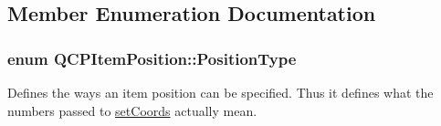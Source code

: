 \subsection{Member Enumeration Documentation}
\subsubsection[{\texorpdfstring{Position\+Type}{PositionType}}]{\setlength{\rightskip}{0pt plus 5cm}enum {\bf Q\+C\+P\+Item\+Position\+::\+Position\+Type}}\hypertarget{classQCPItemPosition_aad9936c22bf43e3d358552f6e86dbdc8}{}\label{classQCPItemPosition_aad9936c22bf43e3d358552f6e86dbdc8}
Defines the ways an item position can be specified. Thus it defines what the numbers passed to \hyperlink{classQCPItemPosition_aa988ba4e87ab684c9021017dcaba945f}{set\+Coords} actually mean.

